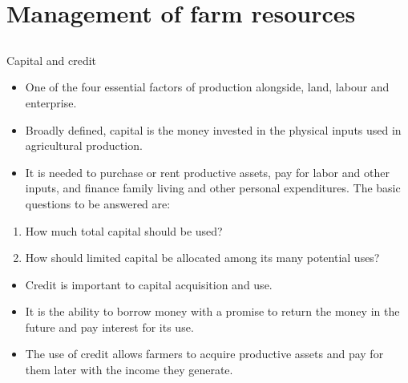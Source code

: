 \documentclass[12pt,ignorenonframetext,aspectratio=169]{beamer}
\providecommand{\tightlist}{%
  \setlength{\itemsep}{0pt}\setlength{\parskip}{0pt}}
\begin{document}
\hypertarget{management-of-farm-resources}{%
\section{Management of farm
resources}\label{management-of-farm-resources}}

\hypertarget{section-2}{%
\subsection{}\label{section-2}}

\begin{frame}{Capital and credit}
\protect\hypertarget{capital-and-credit}{}
\begin{itemize}
\tightlist
\item
  One of the four essential factors of production alongside, land,
  labour and enterprise.
\item
  Broadly defined, capital is the money invested in the physical inputs
  used in agricultural production.
\item
  It is needed to purchase or rent productive assets, pay for labor and
  other inputs, and finance family living and other personal
  expenditures. The basic questions to be answered are:
\end{itemize}

\begin{enumerate}
\tightlist
\item
  How much total capital should be used?
\item
  How should limited capital be allocated among its many potential uses?
\end{enumerate}

\begin{itemize}
\tightlist
\item
  Credit is important to capital acquisition and use.
\item
  It is the ability to borrow money with a promise to return the money
  in the future and pay interest for its use.
\item
  The use of credit allows farmers to acquire productive assets and pay
  for them later with the income they generate.
\end{itemize}
\end{frame}
\end{document}
